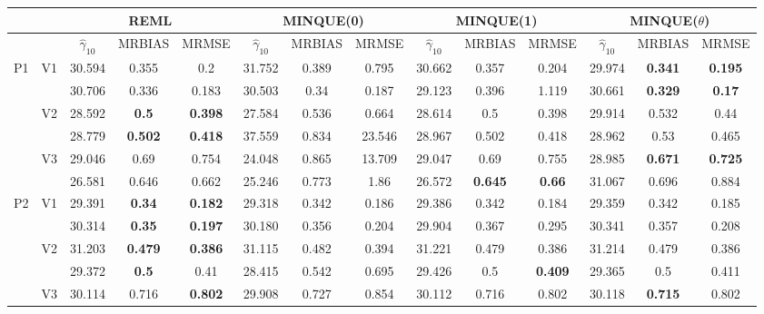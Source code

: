 \documentclass[12pt,a4paper]{article}
\begin{document}
\begin{sidewaystable}[ht]
\centering
{\footnotesize
\begin{tabular}{cc|ccc|ccc|ccc|ccc|}
   & & \multicolumn{3}{c|}{REML}&\multicolumn{3}{c|}{MINQUE(0)}&\multicolumn{3}{c|}{MINQUE(1)}&\multicolumn{3}{c|}{MINQUE($\theta$)}\\ \hline
 &  & $\hat{\gamma}_{10}$ & MRBIAS & MRMSE & $\hat{\gamma}_{10}$ & MRBIAS & MRMSE & $\hat{\gamma}_{10}$ & MRBIAS & MRMSE & $\hat{\gamma}_{10}$ & MRBIAS & MRMSE \\ 
  \hline
\multirow{6}{*}{P1} & \multirow{2}{*}{V1} & 30.594 & 0.355 & 0.2 & 31.752 & 0.389 & 0.795 & 30.662 & 0.357 & 0.204 & 29.974 & \textbf{0.341} & \textbf{0.195} \\ 
   &  & 30.706 & 0.336 & 0.183 & 30.503 & 0.34 & 0.187 & 29.123 & 0.396 & 1.119 & 30.661 & \textbf{0.329} & \textbf{0.17} \\ 
   & \multirow{2}{*}{V2} & 28.592 & \textbf{0.5} & \textbf{0.398} & 27.584 & 0.536 & 0.664 & 28.614 & 0.5 & 0.398 & 29.914 & 0.532 & 0.44 \\ 
   &  & 28.779 & \textbf{0.502} & \textbf{0.418} & 37.559 & 0.834 & 23.546 & 28.967 & 0.502 & 0.418 & 28.962 & 0.53 & 0.465 \\ 
   & \multirow{2}{*}{V3} & 29.046 & 0.69 & 0.754 & 24.048 & 0.865 & 13.709 & 29.047 & 0.69 & 0.755 & 28.985 & \textbf{0.671} & \textbf{0.725} \\ 
   &  & 26.581 & 0.646 & 0.662 & 25.246 & 0.773 & 1.86 & 26.572 & \textbf{0.645} & \textbf{0.66} & 31.067 & 0.696 & 0.884 \\ 
   \hline \hline\multirow{6}{*}{P2} & \multirow{2}{*}{V1} & 29.391 & \textbf{0.34} & \textbf{0.182} & 29.318 & 0.342 & 0.186 & 29.386 & 0.342 & 0.184 & 29.359 & 0.342 & 0.185 \\ 
   &  & 30.314 & \textbf{0.35} & \textbf{0.197} & 30.180 & 0.356 & 0.204 & 29.904 & 0.367 & 0.295 & 30.341 & 0.357 & 0.208 \\ 
   & \multirow{2}{*}{V2} & 31.203 & \textbf{0.479} & \textbf{0.386} & 31.115 & 0.482 & 0.394 & 31.221 & 0.479 & 0.386 & 31.214 & 0.479 & 0.386 \\ 
   &  & 29.372 & \textbf{0.5} & 0.41 & 28.415 & 0.542 & 0.695 & 29.426 & 0.5 & \textbf{0.409} & 29.365 & 0.5 & 0.411 \\ 
   & \multirow{2}{*}{V3} & 30.114 & 0.716 & \textbf{0.802} & 29.908 & 0.727 & 0.854 & 30.112 & 0.716 & 0.802 & 30.118 & \textbf{0.715} & 0.802 \\ 

\end{tabular}}
\end{sidewaystable}
\end{document}
